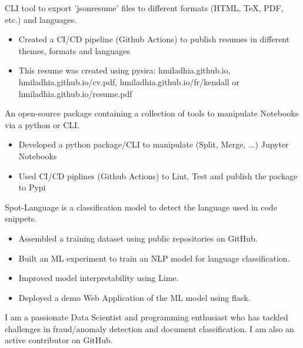 \documentclass[10pt,letter,ragged2e,withhyper]{altacv}
\renewcommand{\divider}{\textcolor{body!30}{\hdashrule{\linewidth}{0.6pt}{0.5ex}}\medskip}
\begin{document}
\begin{paracol}{2}
CLI tool to export 'jsonresume' files to different formats (HTML, TeX, PDF, etc.) and languages.

\begin{itemize}
      \item Created a CI/CD pipeline (Github Actions) to publish resumes in different themes, formats and languages
      \item This resume was created using pysira: hmiladhia.github.io, hmiladhia.github.io/cv.pdf, hmiladhia.github.io/fr/kendall or hmiladhia.github.io/resume.pdf
  \end{itemize}

\divider
{}

An open-source package containing a collection of tools to manipulate Notebooks via a python or CLI.

\begin{itemize}
      \item Developed a python package/CLI to manipulate (Split, Merge, ...) Jupyter Notebooks
      \item Used CI/CD piplines (Github Actions) to Lint, Test and publish the package to Pypi
  \end{itemize}

\divider
{}

Spot-Language is a classification model to detect the language used in code snippets.

\begin{itemize}
      \item Assembled a training dataset using public repositories on GitHub.
      \item Built an ML experiment to train an NLP model for language classification.
      \item Improved model interpretability using Lime.
      \item Deployed a demo Web Application of the ML model using flask.
  \end{itemize}



\switchcolumn
{}
{\small
I am a passionate Data Scientist and programming enthusiast who has tackled challenges 
in fraud/anomaly detection and document classification. 
I am also an active contributor on GitHub.

}
\end{paracol}
\end{document}
